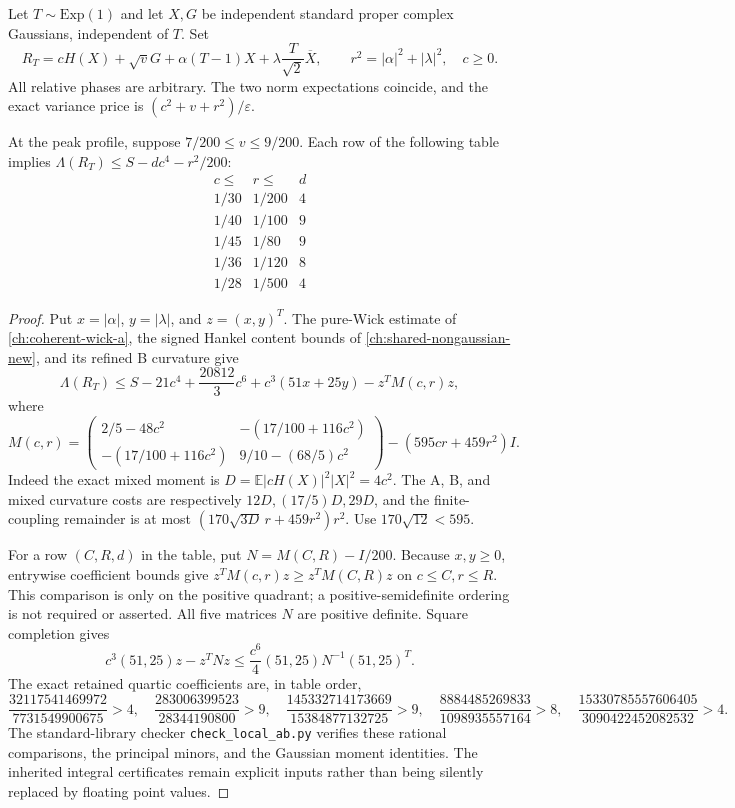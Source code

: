 Let $T\sim\mathrm{Exp}(1)$ and let $X,G$ be independent standard proper
complex Gaussians, independent of $T$. Set
\[
 R_T=cH(X)+\sqrt vG+\alpha(T-1)X
       +\lambda\frac T{\sqrt2}\overline X,
 \qquad r^2=|\alpha|^2+|\lambda|^2,
 \quad c\ge0.
\]
All relative phases are arbitrary. The two norm expectations coincide,
and the exact variance price is $(c^2+v+r^2)/\varepsilon$.

\begin{theorem}
At the peak profile, suppose $7/200\le v\le9/200$. Each row of the
following table implies $\Lambda(R_T)\le S-dc^4-r^2/200$:
\[
\begin{array}{c|c|c}
 c\le&r\le&d\\\hline
 1/30&1/200&4\\
 1/40&1/100&9\\
 1/45&1/80&9\\
 1/36&1/120&8\\
 1/28&1/500&4
\end{array}
\]
\end{theorem}
\begin{proof}
Put $x=|\alpha|$, $y=|\lambda|$, and $z=(x,y)^T$. The pure-Wick
estimate of \autoref{ch:coherent-wick-a}, the signed Hankel content
bounds of \autoref{ch:shared-nongaussian-new}, and its refined B
curvature give
\[
 \Lambda(R_T)\le S-21c^4+\frac{20812}{3}c^6
   +c^3(51x+25y)-z^TM(c,r)z,
\]
where
\[
 M(c,r)=
 \begin{pmatrix}
 2/5-48c^2&-(17/100+116c^2)\\
 -(17/100+116c^2)&9/10-(68/5)c^2
 \end{pmatrix}-(595cr+459r^2)I.
\]
Indeed the exact mixed moment is
$D=\mathbb E|cH(X)|^2|X|^2=4c^2$. The A, B, and mixed curvature
costs are respectively $12D,(17/5)D,29D$, and the finite-coupling
remainder is at most $(170\sqrt{3D}\,r+459r^2)r^2$.
Use $170\sqrt{12}<595$.

For a row $(C,R,d)$ in the table, put $N=M(C,R)-I/200$.
Because $x,y\ge0$, entrywise coefficient bounds give
$z^TM(c,r)z\ge z^TM(C,R)z$ on $c\le C,r\le R$.
This comparison is only on the positive quadrant; a positive-semidefinite
ordering is not required or asserted. All five matrices $N$ are positive
definite. Square completion gives
\[
 c^3(51,25)z-z^TNz
 \le\frac{c^6}{4}(51,25)N^{-1}(51,25)^T.
\]
The exact retained quartic coefficients are, in table order,
\[
\frac{32117541469972}{7731549900675}>4,\quad
\frac{283006399523}{28344190800}>9,\quad
\frac{145332714173669}{15384877132725}>9,\quad
\frac{8884485269833}{1098935557164}>8,\quad
\frac{15330785557606405}{3090422452082532}>4.
\]
The standard-library checker \texttt{check\_local\_ab.py} verifies
these rational comparisons, the principal minors, and the Gaussian
moment identities. The inherited integral certificates remain explicit
inputs rather than being silently replaced by floating point values.
\end{proof}

